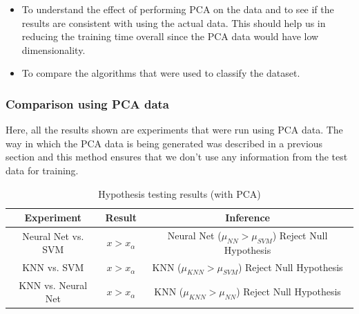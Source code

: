 \documentclass[10pt]{scrartcl}
\begin{document}
\begin{itemize}
\item To understand the effect of performing PCA on the data and to see if the results are consistent with using the actual data. This should help us in reducing the training time overall since the PCA data would have low dimensionality. 

\item To compare the algorithms that were used to classify the dataset.
\end{itemize}


\subsubsection*{Comparison using PCA data}

Here, all the results shown are experiments that were run using PCA data. The way in which the PCA data is being generated was described in a previous section and this method ensures that we don't use any information from the test data for training.

\begin{table}[H]
\centering
\begin{tabular}{ c|c|c } 
 \textbf{Experiment} & \textbf{Result} & \textbf{Inference} \\ 
 \hline
Neural Net vs. SVM & $x > x_{\alpha}$ & Neural Net ($\mu_{NN} > \mu_{SVM}$) Reject Null Hypothesis\\ 
KNN vs. SVM & $x > x_{\alpha}$ &  KNN ($\mu_{KNN} > \mu_{SVM}$) Reject Null Hypothesis\\ 
KNN vs. Neural Net & $x > x_{\alpha}$ &  KNN ($\mu_{KNN} > \mu_{NN}$) Reject Null Hypothesis \\
\end{tabular}
\caption{Hypothesis testing results (with PCA) \label{tab:hypo_test_pca}}
\end{table}
\end{document}
